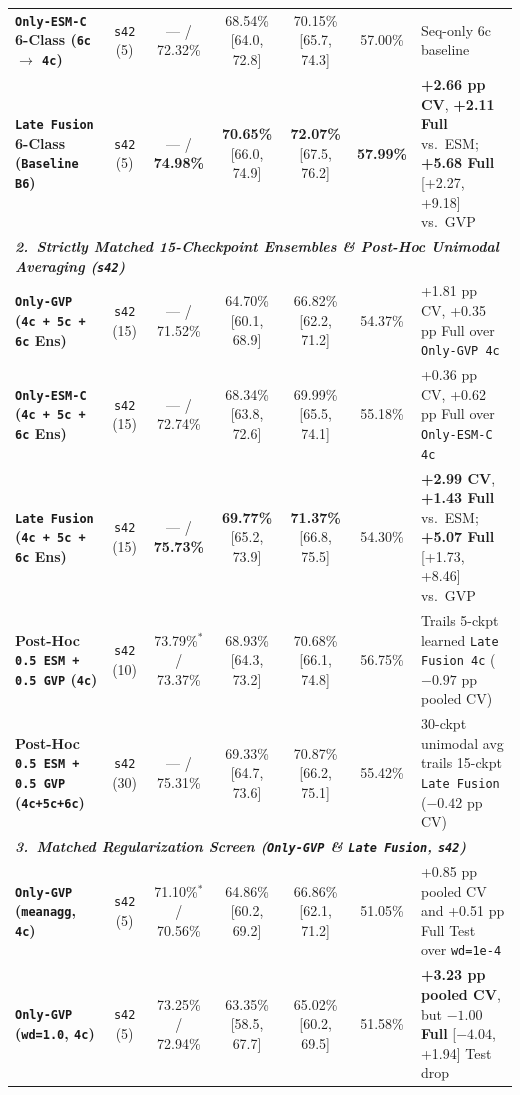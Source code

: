 \documentclass[10pt,a4paper,twocolumn]{article}
\begin{document}
\begin{table}[t!]
\begin{tabular}{lcccccl}
    \textbf{\texttt{Only-ESM-C} 6-Class (\texttt{6c} $\to$ \texttt{4c})} & \texttt{s42} (5) & --- / 72.32\% & 68.54\% [64.0, 72.8] & 70.15\% [65.7, 74.3] & 57.00\% & Seq-only 6c baseline \\
    \textbf{\texttt{Late Fusion} 6-Class (\texttt{Baseline B6})} & \texttt{s42} (5) & --- / \textbf{74.98\%} & \textbf{70.65\%} [66.0, 74.9] & \textbf{72.07\%} [67.5, 76.2] & \textbf{57.99\%} & \textbf{+2.66 pp CV}, \textbf{+2.11 Full} vs.\ ESM; \textbf{+5.68 Full} [+2.27, +9.18] vs.\ GVP \\
    \midrule
    \multicolumn{7}{l}{\textit{\textbf{2.\ Strictly Matched 15-Checkpoint Ensembles \& Post-Hoc Unimodal Averaging (\texttt{s42})}}} \\
    \textbf{\texttt{Only-GVP} (\texttt{4c + 5c + 6c} Ens)} & \texttt{s42} (15) & --- / 71.52\% & 64.70\% [60.1, 68.9] & 66.82\% [62.2, 71.2] & 54.37\% & +1.81 pp CV, +0.35 pp Full over \texttt{Only-GVP 4c} \\
    \textbf{\texttt{Only-ESM-C} (\texttt{4c + 5c + 6c} Ens)} & \texttt{s42} (15) & --- / 72.74\% & 68.34\% [63.8, 72.6] & 69.99\% [65.5, 74.1] & 55.18\% & +0.36 pp CV, +0.62 pp Full over \texttt{Only-ESM-C 4c} \\
    \textbf{\texttt{Late Fusion} (\texttt{4c + 5c + 6c} Ens)} & \texttt{s42} (15) & --- / \textbf{75.73\%} & \textbf{69.77\%} [65.2, 73.9] & \textbf{71.37\%} [66.8, 75.5] & 54.30\% & \textbf{+2.99 CV}, \textbf{+1.43 Full} vs.\ ESM; \textbf{+5.07 Full} [+1.73, +8.46] vs.\ GVP \\
    \textbf{Post-Hoc \texttt{0.5 ESM + 0.5 GVP} (\texttt{4c})} & \texttt{s42} (10) & 73.79\%$^*$ / 73.37\% & 68.93\% [64.3, 73.2] & 70.68\% [66.1, 74.8] & 56.75\% & Trails 5-ckpt learned \texttt{Late Fusion 4c} ($-0.97$ pp pooled CV) \\
    \textbf{Post-Hoc \texttt{0.5 ESM + 0.5 GVP} (\texttt{4c+5c+6c})} & \texttt{s42} (30) & --- / 75.31\% & 69.33\% [64.7, 73.6] & 70.87\% [66.2, 75.1] & 55.42\% & 30-ckpt unimodal avg trails 15-ckpt \texttt{Late Fusion} ($-0.42$ pp CV) \\
    \midrule
    \multicolumn{7}{l}{\textit{\textbf{3.\ Matched Regularization Screen (\texttt{Only-GVP} \& \texttt{Late Fusion}, \texttt{s42})}}} \\
    \textbf{\texttt{Only-GVP} (\texttt{meanagg}, \texttt{4c})} & \texttt{s42} (5) & 71.10\%$^*$ / 70.56\% & 64.86\% [60.2, 69.2] & 66.86\% [62.1, 71.2] & 51.05\% & +0.85 pp pooled CV and +0.51 pp Full Test over \texttt{wd=1e-4} \\
    \textbf{\texttt{Only-GVP} (\texttt{wd=1.0}, \texttt{4c})} & \texttt{s42} (5) & 73.25\% / 72.94\% & 63.35\% [58.5, 67.7] & 65.02\% [60.2, 69.5] & 51.58\% & \textbf{+3.23 pp pooled CV}, but \textbf{$-1.00$ Full} [$-4.04$, +1.94] Test drop \\

\end{tabular}
\end{table}
\end{document}

